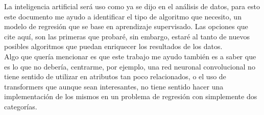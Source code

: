 \documentclass{article}
\begin{document}
La inteligencia artificial será uso como ya se dijo en el análisis de datos, para
esto este documento me ayudo a identificar el tipo de algoritmo que necesito,
un modelo de regresión que se base en aprendizaje supervisado. Las opciones que
cite aquí, son las primeras que probaré, sin embargo, estaré al tanto de nuevos
posibles algoritmos que puedan enriquecer los resultados de los datos. \\

Algo que quería mencionar es que este trabajo me ayudo también es a saber que es
lo que no debería, centrarme, por ejemplo, una red neuronal convolucional no
tiene sentido de utilizar en atributos tan poco relacionados, o el uso de
transformers que aunque sean interesantes, no tiene sentido hacer una implementación
de los mismos en un problema de regresión con simplemente dos categorías.

\newpage


\end{document}
